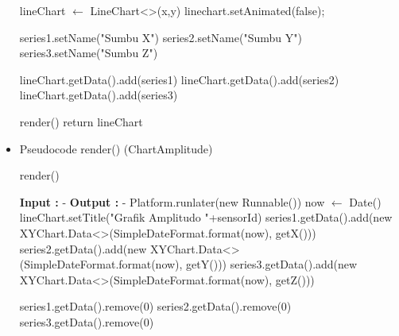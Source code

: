 \begin{itemize}
\begin{breakablealgorithm}
\begin{algorithmic}[1]
                \State lineChart $\leftarrow$ LineChart<>(x,y)
                \State linechart.setAnimated(false);
                
                \State series1.setName("Sumbu X")
                \State series2.setName("Sumbu Y")
                \State series3.setName("Sumbu Z")
                
                \State lineChart.getData().add(series1)
                \State lineChart.getData().add(series2)
                \State lineChart.getData().add(series3)
                
                \State render()
                \State return lineChart
            \EndFunction
        \end{algorithmic}
    \end{breakablealgorithm}
    
    \pagebreak
    \item Pseudocode render() (ChartAmplitude)
    \begin{algorithm}
        \caption{render()}
        \label{alg:renderAmplitude}
        \begin{algorithmic}[1]
            \State \textbf{Input :} -
            \State \textbf{Output :} - 
                \State Platform.runlater(new Runnable()){}
                    \State now $\leftarrow$ Date()
                    \State lineChart.setTitle("Grafik Amplitudo "+sensorId)
                    \State series1.getData().add(new XYChart.Data<>(SimpleDateFormat.format(now), getX()))
                    \State series2.getData().add(new XYChart.Data<>(SimpleDateFormat.format(now), getY()))
                    \State series3.getData().add(new XYChart.Data<>(SimpleDateFormat.format(now), getZ()))
                    
                        \State series1.getData().remove(0)
                        \State series2.getData().remove(0)
                        \State series3.getData().remove(0)
                    \EndIf
                \EndFunction
            \EndFunction
        \end{algorithmic}
    \end{algorithm}


\end{itemize}
